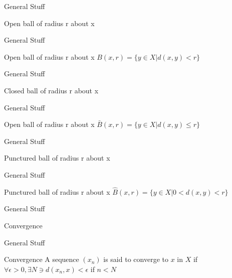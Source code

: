 \documentclass{beamer}
\begin{document}
\begin{frame}{General Stuff}
        \begin{block}{Open ball of radius r about x}
        \end{block}
\end{frame}

\begin{frame}{General Stuff}
        \begin{block}{Open ball of radius r about x}
		$B(x,r) = \{y \in X | d(x,y) < r\}$
        \end{block}
\end{frame}

\begin{frame}{General Stuff}
        \begin{block}{Closed ball of radius r about x}
        \end{block}
\end{frame}

\begin{frame}{General Stuff}
        \begin{block}{Open ball of radius r about x}
		$\bar{B}(x,r) = \{y \in X | d(x,y) \leq r\}$
        \end{block}
\end{frame}

\begin{frame}{General Stuff}
        \begin{block}{Punctured ball of radius r about x}
        \end{block}
\end{frame}

\begin{frame}{General Stuff}
        \begin{block}{Punctured ball of radius r about x}
		$\hat{B}(x,r) = \{y \in X |0 < d(x,y) < r\}$
        \end{block}
\end{frame}

\begin{frame}{General Stuff}
        \begin{block}{Convergence}
        \end{block}
\end{frame}

\begin{frame}{General Stuff}
        \begin{block}{Convergence}
		A sequence $(x_n)$ is said to converge to $x$ in $X$ if\\
		$\forall \epsilon > 0, \exists N \ni d(x_n,x) < \epsilon$ if $n < N$ 
        \end{block}
\end{frame}
\end{document}

